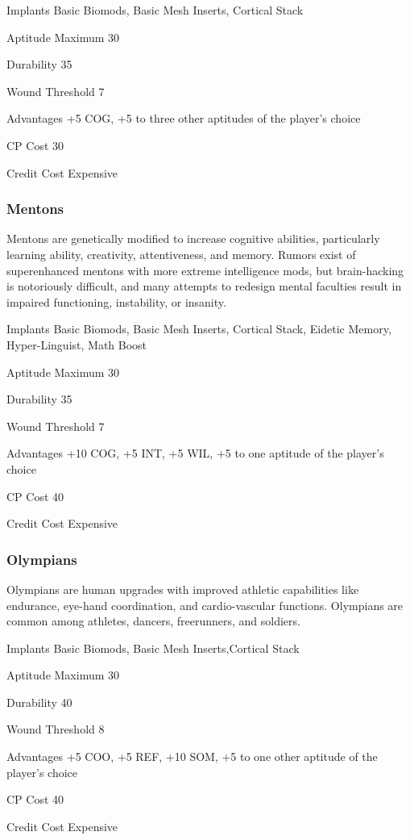 \begin{description*}
\item[Implants]  Basic Biomods, Basic Mesh Inserts, Cortical Stack
\item[Aptitude Maximum]  30 
\item[Durability]  35 
\item[Wound Threshold]  7 
\item[Advantages]  +5 COG, +5 to three other aptitudes of the player’s choice 
\item[CP Cost]  30 
\item[Credit Cost]  Expensive
\end{description*}

\subsubsection{Mentons}
Mentons are genetically modified to increase cognitive abilities,
particularly learning ability, creativity, attentiveness, and memory. Rumors
exist of superenhanced mentons with more extreme intelligence mods, but
brain-hacking is notoriously difficult, and many attempts to redesign mental
faculties result in impaired functioning, instability, or insanity.

\begin{description*}
\item[Implants] Basic Biomods, Basic Mesh Inserts, Cortical Stack, Eidetic
  Memory, Hyper-Linguist, Math Boost
\item[Aptitude Maximum]  30 
\item[Durability]  35 
\item[Wound Threshold]  7 
\item[Advantages] +10 COG, +5 INT, +5 WIL, +5 to one aptitude of the player’s
  choice
\item[CP Cost]  40 
\item[Credit Cost]  Expensive
\end{description*}

\subsubsection{Olympians}
Olympians are human upgrades with improved athletic capabilities like
endurance, eye-hand coordination, and cardio-vascular functions. Olympians
are common among athletes, dancers, freerunners, and soldiers.

\begin{description*}
\item[Implants] Basic Biomods, Basic Mesh Inserts,Cortical Stack 
\item[Aptitude Maximum] 30 
\item[Durability] 40 
\item[Wound Threshold] 8 
\item[Advantages] +5 COO, +5 REF, +10 SOM, +5 to one other aptitude of the
  player’s choice
\item[CP Cost] 40 
\item[Credit Cost] Expensive 
\end{description*}

